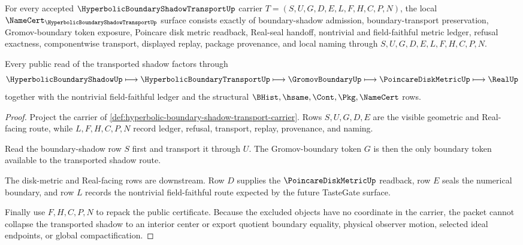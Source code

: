 \begin{theorem}
\label{thm:hyperbolic-boundary-shadow-transport-namecert-obligations}
For every accepted $\HyperbolicBoundaryShadowTransportUp$ carrier
$T=(S,U,G,D,E,L,F,H,C,P,N)$, the local
$\NameCert_{\HyperbolicBoundaryShadowTransportUp}$ surface consists exactly of
boundary-shadow admission, boundary-transport preservation, Gromov-boundary
token exposure, Poincare disk metric readback, Real-seal handoff, nontrivial and
field-faithful metric ledger, refusal exactness, componentwise transport,
displayed replay, package provenance, and local naming through
$S,U,G,D,E,L,F,H,C,P,N$.

Every public read of the transported shadow factors through
$$
\HyperbolicBoundaryShadowUp \longmapsto
\HyperbolicBoundaryTransportUp \longmapsto
\GromovBoundaryUp \longmapsto
\PoincareDiskMetricUp \longmapsto
\RealUp
$$
together with the nontrivial field-faithful ledger and the structural
$\BHist,\hsame,\Cont,\Pkg,\NameCert$ rows.
\end{theorem}
\begin{proof}
Project the carrier of
\autoref{def:hyperbolic-boundary-shadow-transport-carrier}. Rows $S,U,G,D,E$
are the visible geometric and Real-facing route, while $L,F,H,C,P,N$ record
ledger, refusal, transport, replay, provenance, and naming.

Read the boundary-shadow row $S$ first and transport it through $U$. The
Gromov-boundary token $G$ is then the only boundary token available to the
transported shadow route.

The disk-metric and Real-facing rows are downstream. Row $D$ supplies the
$\PoincareDiskMetricUp$ readback, row $E$ seals the numerical boundary, and row
$L$ records the nontrivial field-faithful route expected by the future TasteGate
surface.

Finally use $F,H,C,P,N$ to repack the public certificate. Because the excluded
objects have no coordinate in the carrier, the packet cannot collapse the
transported shadow to an interior center or export quotient boundary equality,
physical observer motion, selected ideal endpoints, or global compactification.
\end{proof}


